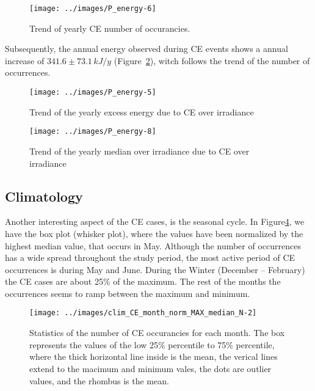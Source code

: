 \documentclass[
]{article}
\begin{document}
\begin{figure}[h!]

{\centering \texttt{[image: ../images/P\_energy-6]} 

}

\caption{Trend of yearly CE number of occurancies.}\label{fig:P-energy-N}
\end{figure}

Subsequently, the annual energy observed during CE events shows a annual increase of
\(341.6\pm 73.1\,kJ/y\)
(Figure~\ref{fig:P-energy-sum}), witch follows the trend of the number of
occurrences.

\begin{figure}[h!]

{\centering \texttt{[image: ../images/P\_energy-5]} 

}

\caption{Trend of the yearly excess energy due to CE over irradiance}\label{fig:P-energy-sum}
\end{figure}

\begin{figure}[h!]

{\centering \texttt{[image: ../images/P\_energy-8]} 

}

\caption{Trend of the yearly median over irradiance due to CE over irradiance}\label{fig:P-energy-median}
\end{figure}

\FloatBarrier

\hypertarget{climatology}{%
\subsection{Climatology}\label{climatology}}

Another interesting aspect of the CE cases, is the seasonal cycle. In
Figure\nobreakspace{}\ref{fig:relative-month-occurancies}, we have the box plot
(whisker plot), where the values have been normalized by the highest median value,
that occurs in May. Although the number of occurrences has a wide spread throughout
the study period, the most active period of CE occurrences is during May and June.
During the Winter (December -- February) the CE cases are about 25\% of the maximum.
The rest of the months the occurrences seems to ramp between the maximum and minimum.

\begin{figure}[h!]

{\centering \texttt{[image: ../images/clim\_CE\_month\_norm\_MAX\_median\_N-2]} 

}

\caption{Statistics of the number of CE occurancies for each month. The box represents the values of the low 25\% percentile to 75\% percentile, where the thick horizontal line inside is the mean, the verical lines extend to the macimum and minimum vales, the dots are outlier values, and the rhombus is the mean.}\label{fig:relative-month-occurancies}
\end{figure}
\end{document}
